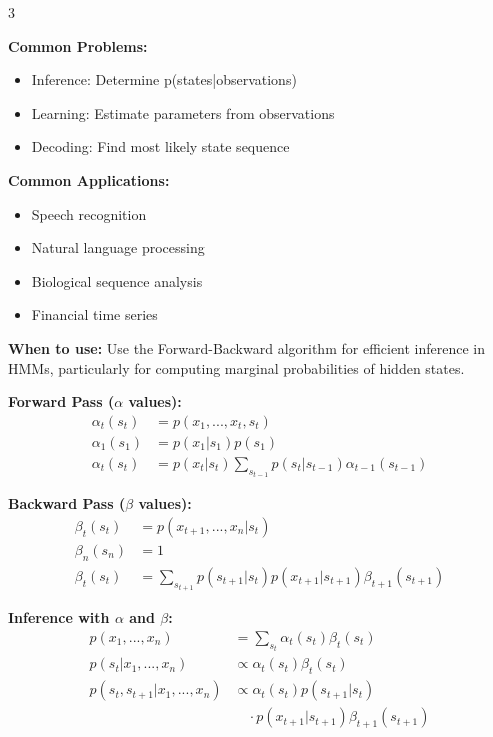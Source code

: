 \documentclass[10pt,landscape]{article}
\begin{document}
\begin{multicols}{3}
\begin{tcolorbox}[breakable, title=9. Hidden Markov Models Concepts, colback=hmm]
\textbf{Common Problems:}
\begin{itemize}[leftmargin=*,noitemsep,topsep=0pt]
    \item Inference: Determine p(states|observations)
    \item Learning: Estimate parameters from observations
    \item Decoding: Find most likely state sequence
\end{itemize}

\textbf{Common Applications:}
\begin{itemize}[leftmargin=*,noitemsep,topsep=0pt]
    \item Speech recognition
    \item Natural language processing
    \item Biological sequence analysis
    \item Financial time series
\end{itemize}
\end{tcolorbox}

\begin{tcolorbox}[breakable, title=9.1 Forward-Backward Algorithm for HMMs, colback=hmm]
\textbf{When to use:} Use the Forward-Backward algorithm for efficient inference in HMMs, particularly for computing marginal probabilities of hidden states.

\textbf{Forward Pass ($\alpha$ values):}
\begin{align}
\alpha_t(s_t) &= p(x_1, ..., x_t, s_t)\\
\alpha_1(s_1) &= p(x_1|s_1)p(s_1)\\
\alpha_t(s_t) &= p(x_t|s_t) \sum_{s_{t-1}} p(s_t|s_{t-1})\alpha_{t-1}(s_{t-1})
\end{align}

\textbf{Backward Pass ($\beta$ values):}
\begin{align}
\beta_t(s_t) &= p(x_{t+1}, ..., x_n|s_t)\\
\beta_n(s_n) &= 1\\
\beta_t(s_t) &= \sum_{s_{t+1}} p(s_{t+1}|s_t)p(x_{t+1}|s_{t+1})\beta_{t+1}(s_{t+1})
\end{align}

\textbf{Inference with $\alpha$ and $\beta$:}
\begin{align}
p(x_1, ..., x_n) &= \sum_{s_t} \alpha_t(s_t)\beta_t(s_t)\\
p(s_t|x_1, ..., x_n) &\propto \alpha_t(s_t)\beta_t(s_t)\\
p(s_t, s_{t+1}|x_1, ..., x_n) &\propto \alpha_t(s_t)p(s_{t+1}|s_t)\\
&\quad\cdot p(x_{t+1}|s_{t+1})\beta_{t+1}(s_{t+1})
\end{align}


\end{tcolorbox}
\end{multicols}
\end{document}
